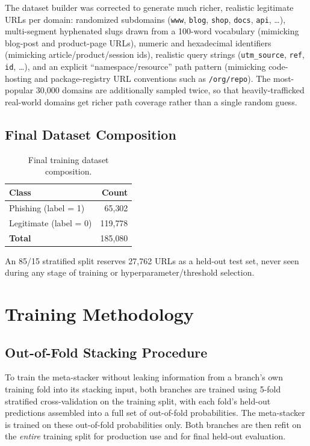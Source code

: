\documentclass[11pt,a4paper]{report}
\begin{document}
The dataset builder was corrected to generate much richer, realistic legitimate URLs
per domain: randomized subdomains (\texttt{www}, \texttt{blog}, \texttt{shop},
\texttt{docs}, \texttt{api}, \ldots), multi-segment hyphenated slugs drawn from a
100-word vocabulary (mimicking blog-post and product-page URLs), numeric and
hexadecimal identifiers (mimicking article/product/session ids), realistic query
strings (\texttt{utm\_source}, \texttt{ref}, \texttt{id}, \ldots), and an explicit
``namespace/resource'' path pattern (mimicking code-hosting and package-registry
URL conventions such as \texttt{/org/repo}). The most-popular 30{,}000 domains are
additionally sampled twice, so that heavily-trafficked real-world domains get
richer path coverage rather than a single random guess.

\section{Final Dataset Composition}
\begin{table}[H]
\centering
\begin{tabular}{lr}
\toprule
\textbf{Class} & \textbf{Count} \\
\midrule
Phishing (label = 1) & 65{,}302 \\
Legitimate (label = 0) & 119{,}778 \\
\midrule
\textbf{Total} & 185{,}080 \\
\bottomrule
\end{tabular}
\caption{Final training dataset composition.}
\end{table}

An 85/15 stratified split reserves 27{,}762 URLs as a held-out test set, never seen
during any stage of training or hyperparameter/threshold selection.

\chapter{Training Methodology}

\section{Out-of-Fold Stacking Procedure}
To train the meta-stacker without leaking information from a branch's own training
fold into its stacking input, both branches are trained using 5-fold stratified
cross-validation on the training split, with each fold's held-out predictions
assembled into a full set of out-of-fold probabilities. The meta-stacker is trained
on these out-of-fold probabilities only. Both branches are then refit on the
\emph{entire} training split for production use and for final held-out evaluation.
\end{document}
